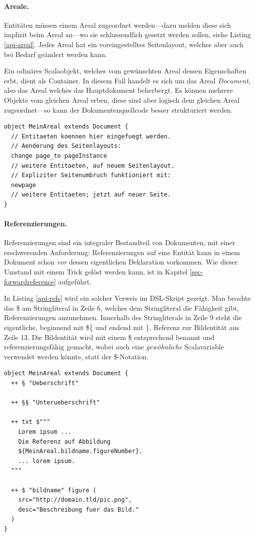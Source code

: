 \paragraph{Areale.}

Entitäten müssen einem Areal zugeordnet werden---dazu
melden diese sich implizit beim Areal an---wo
sie schlussendlich gesetzt werden sollen, siehe
Listing \ref{api-areal}. Jedes Areal
hat ein voreingestelltes Seitenlayout, welches aber auch bei Bedarf
geändert werden kann.

Ein odinäres Scalaobjekt, welches vom gewünschten Areal dessen Eigenschaften
erbt, dient als Container. In diesem Fall handelt es sich um das
Areal \emph{Document}, also das Areal welches das Hauptdokument beherbergt.
Es können mehrere Objekte vom gleichen Areal erben, diese sind aber logisch
dem gleichen Areal zugeordnet---so kann der Dokumentenquellcode besser
strukturiert werden.

\begin{lstlisting}[label=api-areal,caption=Areale bilden.]
object MeinAreal extends Document {
  // Entitaeten koennen hier eingefuegt werden.
  // Aenderung des Seitenlayouts:
  change page_to pageInstance
  // weitere Entitaeten, auf neuem Seitenlayout.
  // Expliziter Seitenumbruch funktioniert mit:
  newpage
  // weitere Entitaeten; jetzt auf neuer Seite.
}
\end{lstlisting}

\paragraph{Referenzierungen.} Referenzierungen sind ein
integraler Bestandteil von Dokumenten,
mit einer erschwerenden Anforderung: Referenzierungen auf eine Entität kann
in einem Dokument schon \emph{vor} dessen eigentlichen Deklaration vorkommen.
Wie dieser Umstand mit einem Trick gelöst werden kann, ist in Kapitel
\ref{sec-forwardreference} aufgeführt.

In Listing \ref{api-refs} wird ein solcher Verweis im DSL-Skript gezeigt.
Man beachte das \$ am Stringliteral in Zeile 6, welches dem Stringliteral
die Fähigkeit gibt, Referenzierungen anzunehmen. Innerhalb des
Stringliterals in Zeile 9 steht die eigentliche, beginnend mit \$\{
und endend mit \}, Referenz zur Bildentität aus Zeile 13.
Die Bildentität wird mit einem \$ entsprechend benannt und
referenzierungsfähig gemacht, wobei auch eine \emph{gewöhnliche}
Scalavariable verwendet werden könnte, statt der \$-Notation.

\begin{lstlisting}[label=api-refs,caption=Referenzierungen im DSL-Skript.]
object MeinAreal extends Document {
  ++ § "Ueberschrift"

  ++ §§ "Unterueberschrift"

  ++ txt $"""
    Lorem ipsum ...
    Die Referenz auf Abbildung
    ${MeinAreal.bildname.figureNumber}.
    ... lorem ipsum.
  """

  ++ $ "bildname" figure (
    src="http://domain.tld/pic.png",
    desc="Beschreibung fuer das Bild."
  )
}
\end{lstlisting}

